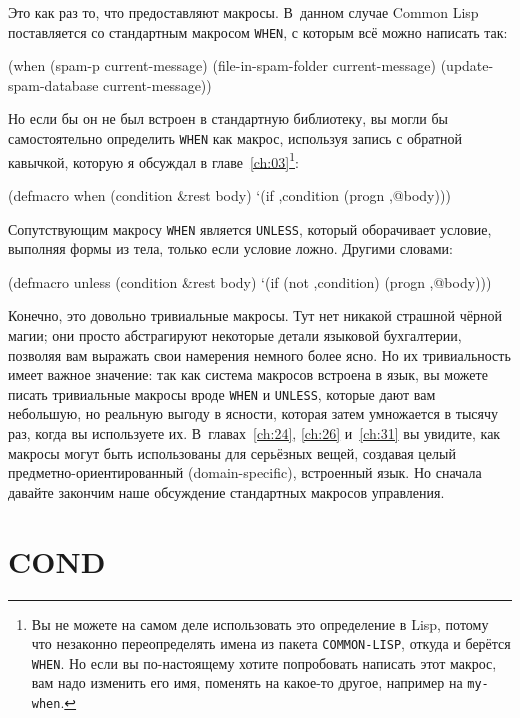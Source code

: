 Это как раз то, что предоставляют макросы. В~данном случае Common Lisp поставляется со
стандартным макросом \lstinline{WHEN}, с которым всё можно написать так:

\begin{myverb}
(when (spam-p current-message)
  (file-in-spam-folder current-message)
  (update-spam-database current-message))
\end{myverb}

Но если бы он не был встроен в стандартную библиотеку, вы могли бы самостоятельно
определить \lstinline{WHEN} как макрос, используя запись с обратной кавычкой, которую я
обсуждал в главе~\ref{ch:03}\footnote{Вы не можете на самом деле использовать это определение в
  Lisp, потому что незаконно переопределять имена из пакета \lstinline{COMMON-LISP}, откуда и
  берётся \lstinline{WHEN}. Но если вы по-настоящему хотите попробовать написать этот макрос,
  вам надо изменить его имя, поменять на какое-то другое, например на \lstinline{my-when}.}\hspace{\footnotenegspace}:

\begin{myverb}
(defmacro when (condition &rest body)
  `(if ,condition (progn ,@body)))
\end{myverb}

Сопутствующим макросу \lstinline{WHEN} является \lstinline{UNLESS}, который оборачивает условие,
выполняя формы из тела, только если условие ложно. Другими словами:

\begin{myverb}
(defmacro unless (condition &rest body)
  `(if (not ,condition) (progn ,@body)))
\end{myverb}

Конечно, это довольно тривиальные макросы. Тут нет никакой страшной чёрной магии; они
просто абстрагируют некоторые детали языковой бухгалтерии, позволяя вам выражать свои
намерения немного более ясно. Но их тривиальность имеет важное значение: так как система
макросов встроена в язык, вы можете писать тривиальные макросы вроде \lstinline{WHEN} и
\lstinline{UNLESS}, которые дают вам небольшую, но реальную выгоду в ясности, которая затем
умножается в тысячу раз, когда вы используете их. В~главах~\ref{ch:24}, \ref{ch:26}
и~\ref{ch:31} вы увидите, как макросы могут быть использованы для серьёзных вещей,
создавая целый предметно-ориентированный (domain-specific), встроенный язык. Но сначала
давайте закончим наше обсуждение стандартных макросов управления.

\section{COND}

